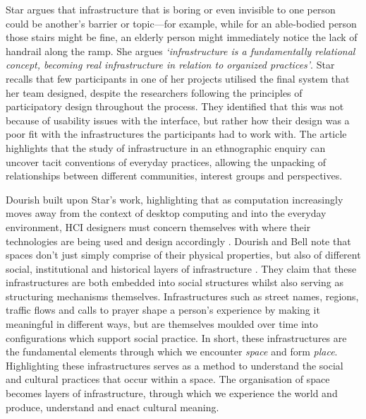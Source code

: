 Star argues that infrastructure that is boring or even invisible to one person could be another's barrier or topic---for example, while for an able-bodied person those stairs might be fine, an elderly person might immediately notice the lack of handrail along the ramp. She argues \textit{`infrastructure is a fundamentally relational concept, becoming real infrastructure in relation to organized practices'}. Star recalls that few participants in one of her projects utilised the final system that her team designed, despite the researchers following the principles of participatory design throughout the process. They identified that this was not because of usability issues with the interface, but rather how their design was a poor fit with the infrastructures the participants had to work with. The article highlights that the study of infrastructure in an ethnographic enquiry can uncover tacit conventions of everyday practices, allowing the unpacking of relationships between different communities, interest groups and perspectives.

Dourish built upon Star's work, highlighting that as computation increasingly moves away from the context of desktop computing and into the everyday environment, HCI designers must concern themselves with where their technologies are being used and design accordingly \citep{Dourish2006}. Dourish and Bell note that spaces don't just simply comprise of their physical properties, but also of different social, institutional and historical layers of infrastructure \citep{Dourish2007}. They claim that these infrastructures are both embedded into social structures whilst also serving as structuring mechanisms themselves. Infrastructures such as street names, regions, traffic flows and calls to prayer shape a person's experience by making it meaningful in different ways, but are themselves moulded over time into configurations which support social practice. In short, these infrastructures are the fundamental elements through which we encounter \textit{space} and form \textit{place}. Highlighting these infrastructures serves as a method to understand the social and cultural practices that occur within a space. The organisation of space becomes layers of infrastructure, through which we experience the world and produce, understand and enact cultural meaning. 


